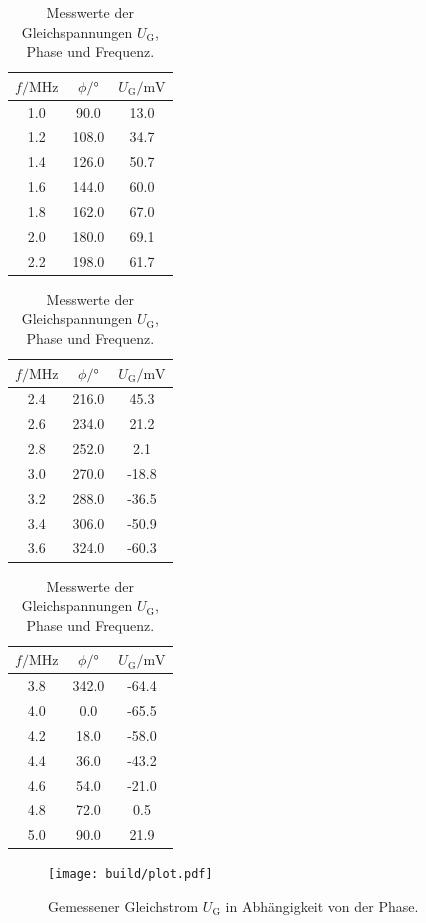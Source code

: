 \begin{table}
  \centering
  \caption{Messwerte der Gleichspannungen $U_{\text{G}}$, Phase \phi und Frequenz.}
  \label{tab:messwerte}
\begin{tabular}{c c c|}
\toprule
$f/\si{\mega\hertz}$ & $\phi / \si{\degree}$ &$ U_{\text{G}}/ \si{\milli\volt}$ \\
  \midrule
   1.0	&	90.0	&	13.0   \\
   1.2	&	108.0	&	34.7   \\
   1.4	&	126.0	&	50.7   \\
   1.6	&	144.0	&	60.0   \\
   1.8	&	162.0	&	67.0   \\
   2.0	&	180.0	&	69.1   \\
   2.2	&	198.0	&	61.7   \\
\bottomrule
\end{tabular}
\begin{tabular}{|c c c|}
  \toprule
  $f/\si{\mega\hertz}$ & $\phi / \si{\degree}$ &$ U_{\text{G}}/ \si{\milli\volt}$ \\
    \midrule
   2.4	&	216.0	&	45.3   \\
   2.6	&	234.0	&	21.2   \\
   2.8	&	252.0	&	2.1   \\
   3.0	&	270.0	&	-18.8   \\
   3.2	&	288.0	&	-36.5   \\
   3.4	&	306.0	&	-50.9   \\
   3.6	&	324.0	&	-60.3   \\
   \bottomrule
   \end{tabular}
  \begin{tabular}{|c c c}
    \toprule
    $f/\si{\mega\hertz}$ & $\phi / \si{\degree}$& $ U_{\text{G}}/ \si{\milli\volt}$ \\
      \midrule
   3.8	&	342.0	&	-64.4   \\
   4.0	&	0.0	&	-65.5   \\
   4.2	&	18.0	&	-58.0   \\
   4.4	&	36.0	&	-43.2   \\
   4.6	&	54.0	&	-21.0   \\
   4.8	&	72.0	&	0.5   \\
   5.0	&	90.0	&	21.9   \\
\bottomrule
\end{tabular}
\end{table}


\begin{figure}
  \centering
  \texttt{[image: build/plot.pdf]}
  \caption{Gemessener Gleichstrom $U_{\text{G}}$ in Abhängigkeit von der Phase.}
  \label{fig:plot}
\end{figure}


